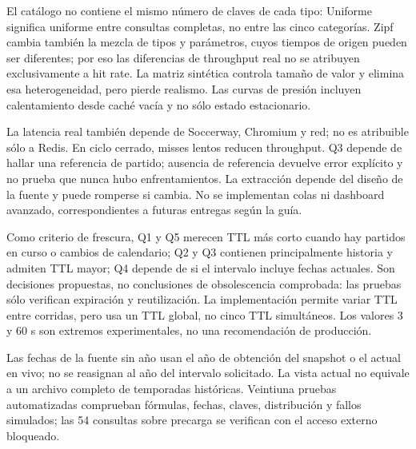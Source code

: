 \documentclass[11pt]{article}
\begin{document}
El catálogo no contiene el mismo número de claves de cada tipo: Uniforme significa uniforme entre consultas completas, no entre las cinco categorías. Zipf cambia también la mezcla de tipos y parámetros, cuyos tiempos de origen pueden ser diferentes; por eso las diferencias de throughput real no se atribuyen exclusivamente a hit rate. La matriz sintética controla tamaño de valor y elimina esa heterogeneidad, pero pierde realismo. Las curvas de presión incluyen calentamiento desde caché vacía y no sólo estado estacionario.

La latencia real también depende de Soccerway, Chromium y red; no es atribuible sólo a Redis. En ciclo cerrado, misses lentos reducen throughput. Q3 depende de hallar una referencia de partido; ausencia de referencia devuelve error explícito y no prueba que nunca hubo enfrentamientos. La extracción depende del diseño de la fuente y puede romperse si cambia. No se implementan colas ni dashboard avanzado, correspondientes a futuras entregas según la guía.

Como criterio de frescura, Q1 y Q5 merecen TTL más corto cuando hay partidos en curso o cambios de calendario; Q2 y Q3 contienen principalmente historia y admiten TTL mayor; Q4 depende de si el intervalo incluye fechas actuales. Son decisiones propuestas, no conclusiones de obsolescencia comprobada: las pruebas sólo verifican expiración y reutilización. La implementación permite variar TTL entre corridas, pero usa un TTL global, no cinco TTL simultáneos. Los valores 3 y 60 s son extremos experimentales, no una recomendación de producción.

Las fechas de la fuente sin año usan el año de obtención del snapshot o el actual en vivo; no se reasignan al año del intervalo solicitado. La vista actual no equivale a un archivo completo de temporadas históricas. Veintiuna pruebas automatizadas comprueban fórmulas, fechas, claves, distribución y fallos simulados; las 54 consultas sobre precarga se verifican con el acceso externo bloqueado.
\end{document}
